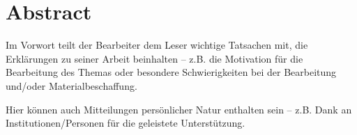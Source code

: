 

\chapter*{Abstract}



Im Vorwort teilt der Bearbeiter dem Leser wichtige Tatsachen mit, die Erklärungen zu seiner Arbeit beinhalten -- z.B. die Motivation für die Bearbeitung des Themas oder besondere Schwierigkeiten bei der Bearbeitung und/oder Materialbeschaffung. 

Hier können auch Mitteilungen persönlicher Natur enthalten sein -- z.B. Dank an Institutionen/Personen für die geleistete Unterstützung. 